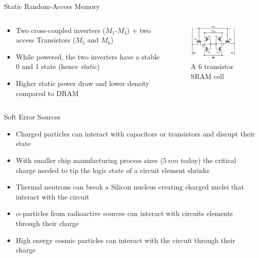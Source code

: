 \documentclass[aspectratio=169,hyperref={pdfpagelabels=false}]{beamer}
\begin{document}
\begin{frame}{Static Random-Access Memory}
    \begin{columns}
        \begin{column}{0.56\textwidth}
            \begin{itemize}
                \item Two cross-coupled inverters ($M_1$-$M_4$) + two access Transistors ($M_5$ and $M_6$)
                \item While powered, the two inverters have a stable 0 and 1 state (hence \textit{static})
                \item Higher static power draw and lower density compared to DRAM
            \end{itemize}
        \end{column}
        \begin{column}{0.39\textwidth}
            \begin{figure}
                \includegraphics[width=5cm]{fig/SRAM_Cell_(6_Transistors).png}
                \caption{A 6 transistor SRAM cell\footnotemark}
            \end{figure}
        \end{column}
    \end{columns}
\end{frame}

\begin{frame}{Soft Error Sources}
    
    \begin{itemize}
        \item Charged particles can interact with capacitors or transistors and disrupt their state
        \item With smaller chip manufacturing process sizes ($\SI{5}{nm}$ today) the critical charge needed to tip the logic state of a circuit element shrinks
        \item Thermal neutrons can break a Silicon nucleus creating charged nuclei that interact with the circuit
        \item $\alpha$-particles from radioactive sources can interact with circuits elements through their charge
        \item High energy cosmic particles can interact with the circuit through their charge
    \end{itemize}

\end{frame}
\end{document}
